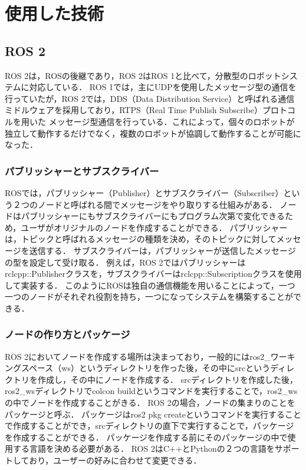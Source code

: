 \chapter{使用した技術}
\label{sec:usage}
\section{ROS 2}
ROS 2は，ROSの後継であり，ROS 2はROS 1と比べて，分散型のロボットシステムに対応している．
ROS 1では，主にUDPを使用したメッセージ型の通信を行っていたが，ROS 2では，DDS（Data Distribution Service）と呼ばれる通信ミドルウェアを採用しており，RTPS（Real Time Publish Subscribe）プロトコルを用いた
メッセージ型通信を行っている．これによって，個々のロボットが独立して動作するだけでなく，複数のロボットが協調して動作することが可能になった．
\subsection{パブリッシャーとサブスクライバー}
ROSでは，パブリッシャー（Publisher）とサブスクライバー（Subscriber）という２つのノードと呼ばれる間でメッセージをやり取りする仕組みがある．
ノードはパブリッシャーにもサブスクライバーにもプログラム次第で変化できるため，ユーザがオリジナルのノードを作成することができる．
パブリッシャーは，トピックと呼ばれるメッセージの種類を決め，そのトピックに対してメッセージを送信する．
サブスクライバーは，パブリッシャーが送信したメッセージの型を設定して受け取る．
例えば，ROS 2ではパブリッシャーはrclcpp::Publisherクラスを，サブスクライバーはrclcpp::Subscriptionクラスを使用して実装する．
このようにROSは独自の通信機能を用いることによって，一つ一つのノードがそれぞれ役割を持ち，一つになってシステムを構築することができる．
\subsection{ノードの作り方とパッケージ}
ROS 2においてノードを作成する場所は決まっており，一般的にはros2_ワーキングスペース（ws）というディレクトリを作った後，その中にsrcというディレクトリを作成し，その中にノードを作成する．
srcディレクトリを作成した後，ros2_wsディレクトリでcolcon buildというコマンドを実行することで，ros2_wsの中でノードを作成することがきる．
ROS 2の場合，ノードの集まりのことをパッケージと呼ぶ．
パッケージはros2 pkg createというコマンドを実行することで作成することができ，srcディレクトリの直下で実行することで，パッケージを作成することができる．
パッケージを作成する前にそのパッケージの中で使用する言語を決める必要がある．
ROS 2はC++とPythonの２つの言語をサポートしており，ユーザーの好みに合わせて変更できる．
